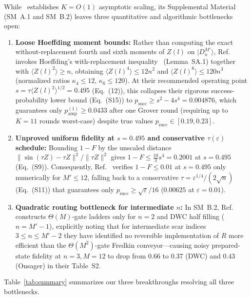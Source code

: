 \documentclass[11pt,a4paper]{article}
\theoremstyle{remark}
\newcommand{\ket}[1]{\lvert #1 \rangle}
\begin{document}
While~\cite{AKN26} establishes $K = O(1)$ asymptotic scaling, its Supplemental Material (SM~A.1 and SM~B.2) leaves three quantitative and algorithmic bottlenecks open:
\begin{enumerate}
\item \textbf{Loose Hoeffding moment bounds:} Rather than computing the exact without-replacement fourth and sixth moments of $Z(l)$ on $\ket{D_n^{M'}}$, Ref.~\cite{AKN26} invokes Hoeffding's with-replacement inequality~\cite{Hoe63} (Lemma~SA.1) together with $\langle Z(l)^2 \rangle \ge n$, obtaining $\langle Z(l)^4 \rangle \le 12n^2$ and $\langle Z(l)^6 \rangle \le 120n^3$ (normalized ratios $\kappa_4 \le 12$, $\kappa_6 \le 120$). At their recommended operating point $s = \tau\langle Z(l)^2 \rangle^{1/2} = 0.495$ (Eq.~(12)), this collapses their rigorous success-probability lower bound (Eq.~(S15)) to $p_{\mathrm{succ}} \ge s^2 - 4s^4 = 0.004876$, which guarantees only $p_{\mathrm{amp}}^{(1)} \ge 0.0433$ after one Grover round (requiring up to $K = 11$ rounds worst-case) despite true values $p_{\mathrm{succ}} \in [0.19, 0.23]$.
\item \textbf{Unproved uniform fidelity at $s = 0.495$ and conservative $\tau(\varepsilon)$ schedule:} Bounding $1 - F$ by the unscaled distance $\|\sin(\tau Z) - \tau Z\|^2/\|\tau Z\|^2$ gives $1 - F \le \frac{10}{3} s^4 = 0.2001$ at $s = 0.495$ (Eq.~(S9)). Consequently, Ref.~\cite{AKN26} verifies $1 - F \le 0.01$ at $s = 0.495$ only numerically for $M' \le 12$, falling back to a conservative $\tau = \varepsilon^{1/4}/(2\sqrt{n})$ (Eq.~(S11)) that guarantees only $p_{\mathrm{succ}} \ge \sqrt{\varepsilon}/16$ ($0.00625$ at $\varepsilon = 0.01$).
\item \textbf{Quadratic routing bottleneck for intermediate $n$:} In SM~B.2, Ref.~\cite{AKN26} constructs $\Theta(M)$-gate ladders only for $n = 2$ and DWC half filling ($n = M'-1$), explicitly noting that for intermediate scar indices $3 \le n \le M'-2$ they have identified no reversible implementation of $R$ more efficient than the $\Theta(M^2)$-gate Fredkin conveyor—causing noisy prepared-state fidelity at $n=3, M=12$ to drop from $0.66$ to $0.37$ (DWC) and $0.43$ (Onsager) in their Table~S2.
\end{enumerate}

Table~\ref{tab:summary} summarizes our three breakthroughs resolving all three bottlenecks.
\end{document}
